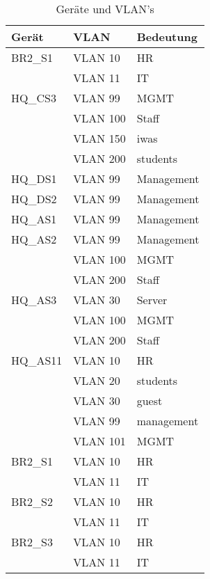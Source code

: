 \begin{table}[h]
	\centering
	\begin{tabu} to \linewidth {l l l}
		\toprule 
		Gerät & VLAN & Bedeutung \\
		\midrule
		BR2\_S1	& VLAN 10 & HR \\
				& VLAN 11 & IT \\
		HQ\_CS3	& VLAN 99 & MGMT \\
				& VLAN 100 & Staff \\
				& VLAN 150 & iwas \\
				& VLAN 200 & students \\
		HQ\_DS1	& VLAN 99  & Management \\
		HQ\_DS2	& VLAN 99  & Management \\
		HQ\_AS1	& VLAN 99  & Management \\
		HQ\_AS2	& VLAN 99  & Management \\
				& VLAN 100 & MGMT \\
				& VLAN 200 & Staff \\	
		HQ\_AS3 & VLAN 30  & Server \\
				& VLAN 100 & MGMT \\
				& VLAN 200 & Staff \\
		HQ\_AS11& VLAN 10 & HR \\
				& VLAN 20 & students \\
				& VLAN 30 & guest \\
				& VLAN 99 & management \\
				& VLAN 101 & MGMT \\
		BR2\_S1 & VLAN 10 & HR \\
				& VLAN 11 & IT \\
		BR2\_S2 & VLAN 10 & HR \\
				& VLAN 11 & IT \\
		BR2\_S3 & VLAN 10 & HR \\
				& VLAN 11 & IT \\
		\bottomrule 
	\end{tabu} 
	\label{tbl:vlan_all}
	\caption{Geräte und VLAN's}
\end{table}

